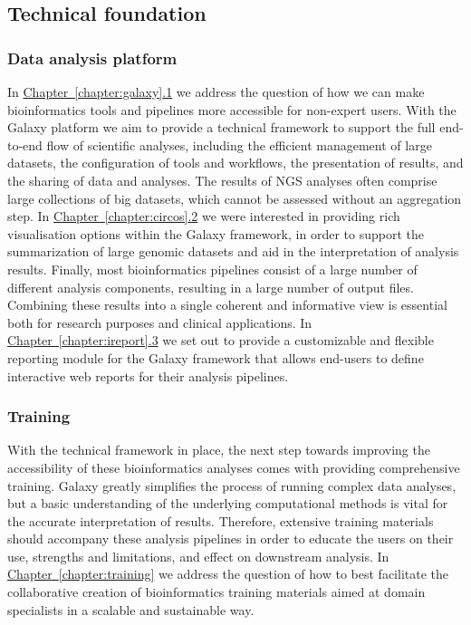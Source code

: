 \begin{justify}
\subsection*{Technical foundation}

\subsubsection*{Data analysis platform}
In \hyperref[chapter:galaxy]{Chapter~\ref{chapter:galaxy}.1} we address the question of how we can make bioinformatics tools and pipelines more accessible for non-expert users.
With the Galaxy platform we aim to provide a technical framework to support the full end-to-end flow of scientific analyses, including the efficient management of large datasets, the configuration of tools and workflows, the presentation of results, and the sharing of data and analyses.
The results of NGS analyses often comprise large collections of big datasets, which cannot be assessed without an aggregation step.
In \hyperref[chapter:circos]{Chapter~\ref{chapter:circos}.2} we were interested in providing rich visualisation options within the Galaxy framework, in order to support the summarization of large genomic datasets and aid in the interpretation of analysis results.
Finally, most bioinformatics pipelines consist of a large number of different analysis components, resulting in a large number of output files.
Combining these results into a single coherent and informative view is essential both for research purposes and clinical applications.
In \hyperref[chapter:ireport]{Chapter~\ref{chapter:ireport}.3} we set out to provide a customizable and flexible reporting module for the Galaxy framework that allows end-users to define interactive web reports for their analysis pipelines.

\subsubsection*{Training}
With the technical framework in place, the next step towards improving the accessibility of these bioinformatics analyses comes with providing comprehensive training.
Galaxy greatly simplifies the process of running complex data analyses, but a basic understanding of the underlying computational methods is vital for the accurate interpretation of results.
Therefore, extensive training materials should accompany these analysis pipelines in order to educate the users on their use, strengths and limitations, and effect on downstream analysis.
In \hyperref[chapter:training]{Chapter~\ref{chapter:training}} we address the question of how to best facilitate the collaborative creation of bioinformatics training materials aimed at domain specialists in a scalable and sustainable way.


\end{justify}
